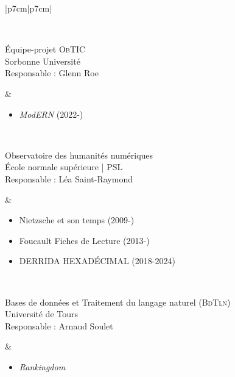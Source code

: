 \begin{table}[htbp]
{\begin{tabular}[t]{|p{7cm}|p{7cm}|}
\begin{minipage}[t]{\linewidth}
\begin{itemize}[leftmargin=*]
				\end{itemize}
			\end{minipage} \\ \hline
						\begin{minipage}[t]{\linewidth}
				Équipe-projet \textsc{ObTIC}\\
				Sorbonne Université\\
				Responsable : Glenn Roe
			\end{minipage}
			&
			\begin{minipage}[t]{\linewidth}
				\begin{itemize}[leftmargin=*]
					\item \textit{Mod\textsc{ERN}} (2022-)
					
				\end{itemize}
			\end{minipage} \\ \hline
			\begin{minipage}[t]{\linewidth}
				Observatoire des humanités numériques\\
				École normale supérieure | \textsc{PSL}\\
				Responsable : Léa Saint-Raymond
			\end{minipage} 
			& 
			\begin{minipage}[t]{\linewidth}
				\begin{itemize}[leftmargin=*]
					\item \og{}Nietzsche et son temps\fg{} (2009-)
					\item \og{}Foucault Fiches de Lecture \fg{} (2013-)
					\item \og{}DERRIDA HEXADÉCIMAL\fg{} (2018-2024)
				\end{itemize}
			\end{minipage} \\ 
					\begin{minipage}[t]{\linewidth}
				Bases de données et Traitement du langage naturel (\textsc{BdTln})\\
				Université de Tours\\
				Responsable : Arnaud Soulet
			\end{minipage}
			&
			\begin{minipage}[t]{\linewidth}
				\begin{itemize}[leftmargin=*]
					\item \textit{Rankingdom} 
					

\end{itemize}
\end{minipage}
\end{tabular}}
\end{table}
